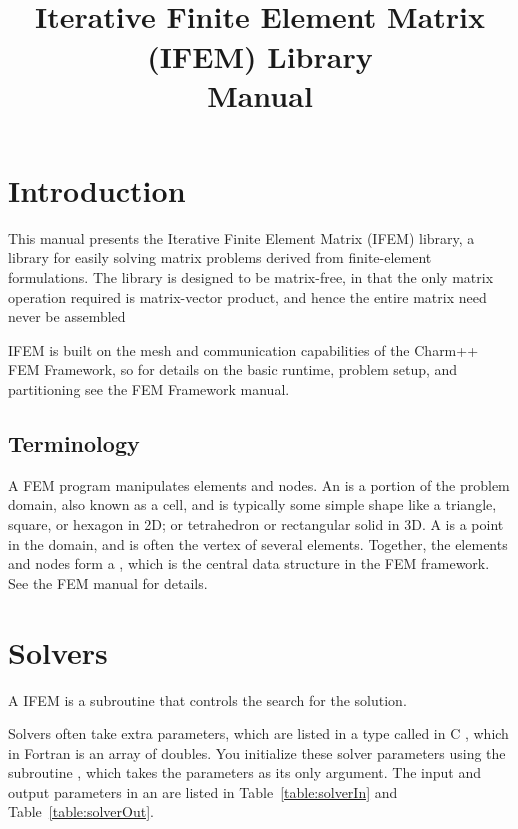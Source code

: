 \documentclass[10pt]{article}
\title{\charmpp\\ Iterative Finite Element Matrix (IFEM) Library\\ Manual}
\begin{document}
\maketitle

\section{Introduction}

This manual presents the Iterative Finite Element Matrix (IFEM) library,
a library for easily solving matrix problems derived from 
finite-element formulations.  The library is designed to be matrix-free,
in that the only matrix operation required is matrix-vector product,
and hence the entire matrix need never be assembled

IFEM is built on the mesh and communication capabilities of the Charm++ 
FEM Framework, so for details on the basic runtime, problem setup, and 
partitioning see the FEM Framework manual.


\subsection{Terminology}

A FEM program manipulates elements and nodes. An  is a portion of
the problem domain, also known as a cell, and is typically some simple shape 
like a triangle, square, or hexagon in 2D; or tetrahedron or rectangular solid in 3D.  
A  is a point in the domain, and is often the vertex of several elements.  
Together, the elements and nodes form a , which is the 
central data structure in the FEM framework.  See the FEM manual for details.

\section{Solvers}
\label{sec:solver}
A IFEM  is a subroutine that controls the search for the solution.

Solvers often take extra parameters, which are listed in a type called 
in C , which in Fortran is an array of  doubles.  
You initialize these solver parameters using the subroutine , 
which takes the parameters as its only argument.  The input and output
parameters in an  are listed in Table~\ref{table:solverIn}
and Table~\ref{table:solverOut}.
\end{document}
